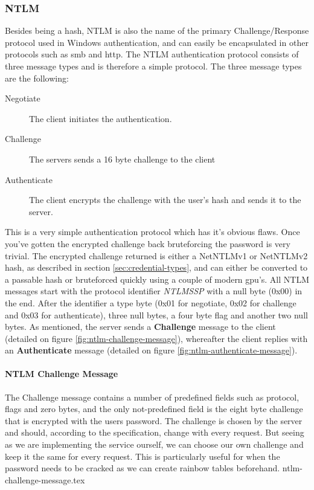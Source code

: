 \documentclass{article}
\begin{document}
\subsubsection{NTLM}
Besides being a hash, NTLM is also the name of the primary Challenge/Response protocol used in Windows authentication, and can easily be encapsulated in other protocols such as \gls{smb} and \gls{http}. The NTLM authentication protocol consists of three message types and is therefore a simple protocol\cite{url:microsoft:ntlm-message-syntax}. The three message types are the following:

\begin{description}
    \item[Negotiate] The client initiates the authentication.
    \item[Challenge] The servers sends a 16 byte challenge to the client
    \item[Authenticate] The client encrypts the challenge with the user's hash and sends it to the server.
\end{description}

This is a very simple authentication protocol which has it's obvious flaws. Once you've gotten the encrypted challenge back bruteforcing the password is very trivial. The encrypted challenge returned is either a NetNTLMv1 or NetNTLMv2 hash, as described in section \ref{sec:credential-types}, and can either be converted to a passable hash or bruteforced quickly using a couple of modern \gls{gpu}'s. All NTLM messages start with the protocol identifier \emph{NTLMSSP} with  a null byte (0x00) in the end\cite{url:http-ntlm-authentication}. After the identifier a type byte (0x01 for negotiate, 0x02 for challenge and 0x03 for authenticate), three null bytes, a four byte flag and another two null bytes. As mentioned, the server sends a \textbf{Challenge} message to the client (detailed on figure \ref{fig:ntlm-challenge-message}), whereafter the client replies with an \textbf{Authenticate} message (detailed on figure \ref{fig:ntlm-authenticate-message}).

\paragraph{NTLM Challenge Message}
The Challenge message contains a number of predefined fields such as protocol, flags and zero bytes, and the only not-predefined field is the eight byte challenge that is encrypted with the users password. The challenge is chosen by the server and should, according to the specification, change with every request. But seeing as we are implementing the service ourself, we can choose our own challenge and keep it the same for every request. This is particularly useful for when the password needs to be cracked as we can create rainbow tables beforehand.
{ntlm-challenge-message.tex}
\end{document}
